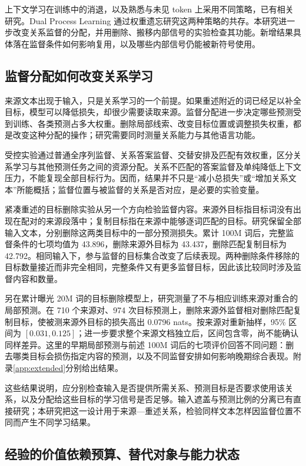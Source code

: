 上下文学习在训练中的消退，以及熟悉与未见 token 上采用不同策略，已有相关研究\citep{singh2023transient,anand2025dual}。Dual Process Learning 通过权重遗忘研究这两种策略的共存。本研究进一步改变关系监督的分配，并用删除、搬移内部信号的实验检查其功能。新增结果具体落在监督条件如何影响复用，以及哪些内部信号仍能被新符号使用。

\subsection{监督分配如何改变关系学习}

来源文本出现于输入，只是关系学习的一个前提。如果重述附近的词已经足以补全目标，模型可以降低损失，却很少需要读取来源。监督分配进一步决定哪些预测受到训练、各类预测占多大权重。删除局部线索、改变目标位置或调整损失权重，都是改变这种分配的操作；研究需要同时测量关系能力与其他语言功能。

受控实验通过普通全序列监督、关系答案监督、交替安排及匹配有效权重，区分关系学习与其他预测任务之间的资源分配。关系不匹配的答案监督及单纯降低上下文压力，不能复现全部目标行为。因而，结果并不只是“减小总损失”或“增加关系文本”所能概括；监督位置与被监督的关系是否对应，是必要的实验变量。

紧凑重述的目标删除实验从另一个方向检验监督内容。来源外目标指目标词没有出现在配对的来源段落中；复制目标指在来源中能够逐词匹配的目标。研究保留全部输入文本，分别删除这两类目标中的一部分预测损失。累计 100M 词后，完整监督条件的七项均值为 43.896，删除来源外目标为 43.437，删除匹配复制目标为 42.792。相同输入下，参与监督的目标集合改变了后续表现。两种删除条件移除的目标数量接近而非完全相同，完整条件又有更多监督目标，因此该比较同时涉及监督内容和数量。

另在累计曝光 20M 词的目标删除模型上，研究测量了不与相应训练来源对重合的局部预测。在 710 个来源对、974 次目标预测上，删除来源外监督相对删除匹配复制目标，使被测来源外目标的损失高出 0.0796 nats。按来源对重新抽样，95\% 区间为 $[0.031,0.125]$；进一步要求整个来源文档独立后，区间包含零，尚不能确认同样差异。这里的早期局部预测与前述 100M 词后的七项评价回答不同问题：删去哪类目标会损伤指定内容的预测，以及不同监督安排如何影响晚期综合表现。附录\ref{app:extended}分别给出结果。

这些结果说明，应分别检查输入是否提供所需关系、预测目标是否要求使用该关系，以及分配给这些目标的学习信号是否足够。输入遮盖与预测比例的分离已有直接研究\citep{wettig2023mask}；本研究把这一设计用于来源—重述关系，检验同样文本怎样因监督位置不同而产生不同学习结果。

\subsection{经验的价值依赖预算、替代对象与能力状态}

